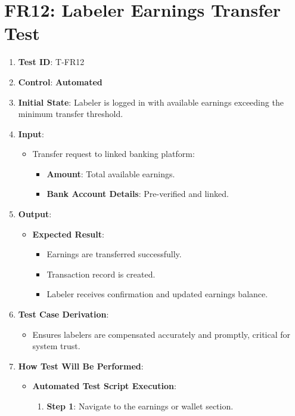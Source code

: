\documentclass[12pt, titlepage]{article}
\begin{document}
\section*{FR12: Labeler Earnings Transfer Test}

\begin{enumerate}
    \item \textbf{Test ID}: T-FR12
    \item \textbf{Control}: \textbf{Automated}
    \item \textbf{Initial State}: Labeler is logged in with available earnings exceeding the minimum transfer threshold.
    \item \textbf{Input}:
    \begin{itemize}
        \item Transfer request to linked banking platform:
        \begin{itemize}
            \item \textbf{Amount}: Total available earnings.
            \item \textbf{Bank Account Details}: Pre-verified and linked.
        \end{itemize}
    \end{itemize}
    \item \textbf{Output}:
    \begin{itemize}
        \item \textbf{Expected Result}:
        \begin{itemize}
            \item Earnings are transferred successfully.
            \item Transaction record is created.
            \item Labeler receives confirmation and updated earnings balance.
        \end{itemize}
    \end{itemize}
    \item \textbf{Test Case Derivation}:
    \begin{itemize}
        \item Ensures labelers are compensated accurately and promptly, critical for system trust.
    \end{itemize}
    \item \textbf{How Test Will Be Performed}:
    \begin{itemize}
        \item \textbf{Automated Test Script Execution}:
        \begin{enumerate}
            \item \textbf{Step 1}: Navigate to the earnings or wallet section.

\end{enumerate}
\end{itemize}
\end{enumerate}
\end{document}
